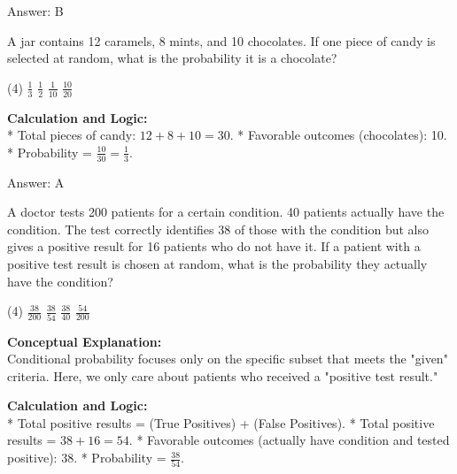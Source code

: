 \documentclass[11pt,paper=a4,answers]{exam}
\begin{document}
\begin{questions}
\begin{solution}
\vspace{30pt}

Answer: \colorbox{yellow!100}{B}
\end{solution}

\vspace{60pt}

\question
A jar contains 12 caramels, 8 mints, and 10 chocolates. If one piece of candy is selected at random, what is the probability it is a chocolate?
\begin{tasks}(4)
    \task $\frac{1}{3}$
    \task $\frac{1}{2}$
    \task $\frac{1}{10}$
    \task $\frac{10}{20}$
\end{tasks}

\begin{solution}
\textbf{Calculation and Logic:} \\
* Total pieces of candy: $12 + 8 + 10 = 30$.
* Favorable outcomes (chocolates): 10.
* Probability = $\frac{10}{30} = \frac{1}{3}$.

\vspace{30pt}

Answer: \colorbox{yellow!100}{A}
\end{solution}

\vspace{60pt}

\question
A doctor tests 200 patients for a certain condition. 40 patients actually have the condition. The test correctly identifies 38 of those with the condition but also gives a positive result for 16 patients who do not have it. If a patient with a positive test result is chosen at random, what is the probability they actually have the condition?
\begin{tasks}(4)
    \task $\frac{38}{200}$
    \task $\frac{38}{54}$
    \task $\frac{38}{40}$
    \task $\frac{54}{200}$
\end{tasks}

\begin{solution}
\textbf{Conceptual Explanation:} \\
Conditional probability focuses only on the specific subset that meets the "given" criteria. Here, we only care about patients who received a "positive test result."

\vspace{30pt}

\textbf{Calculation and Logic:} \\
* Total positive results = (True Positives) + (False Positives).
* Total positive results = $38 + 16 = 54$.
* Favorable outcomes (actually have condition and tested positive): 38.
* Probability = $\frac{38}{54}$.


\end{solution}
\end{questions}
\end{document}
